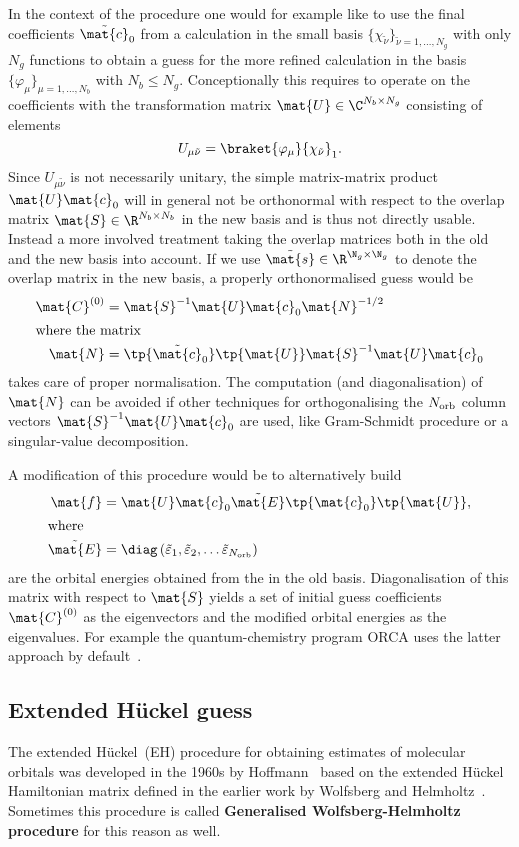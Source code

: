 In the context of the \SCF procedure one would for example
like to use the final coefficients $\tilde{\mat{c}}_0$ from a calculation
in the small basis $\{\chi_{\tilde{\nu}}\}_{\tilde{\nu}=1,\ldots,N_g}$
with only $N_g$ functions
to obtain a guess for the more refined calculation in the basis
$\{\varphi_\mu\}_{\mu=1,\ldots,N_b}$ with $N_b \leq N_g$.
Conceptionally this requires to operate on the coefficients
with the transformation matrix
$\mat{U} \in \C^{N_b\times N_g}$
consisting of elements
\[ U_{\mu\tilde{\nu}} = \braket{\varphi_\mu}{\chi_{\tilde{\nu}}}_1. \]
Since $U_{\mu\tilde{\nu}}$ is not necessarily unitary,
the simple matrix-matrix product $\mat{U} \mat{c}_0$
will in general not be orthonormal
with respect to the overlap matrix $\mat{S} \in \R^{N_b \times N_b}$
in the new basis and is thus not directly usable.
Instead a more involved treatment taking the overlap matrices
both in the old and the new basis into account.
If we use $\tilde{\mat{s}} \in \R^{\N_g \times \N_g}$
to denote the overlap matrix in the new basis,
a properly orthonormalised guess would be~\cite{Polly2004}
\begin{align}
	\mat{C}^{(0)} &= \mat{S}^{-1} \mat{U} \mat{c}_0 \mat{N}^{-1/2} \\
	\intertext{where the matrix}
	\mat{N} &= \tp{\tilde{\mat{c}}_0} \tp{\mat{U}} \mat{S}^{-1} \mat{U} \mat{c}_0
\end{align}
takes care of proper normalisation.
The computation (and diagonalisation) of $\mat{N}$
can be avoided if other techniques
for orthogonalising the $N_\text{orb}$ column vectors $\mat{S}^{-1} \mat{U} \mat{c}_0$
are used, like Gram-Schmidt procedure or a singular-value decomposition.

A modification of this procedure would be to alternatively build
\begin{align}
	\label{eqn:GuessMatF}
	\mat{f} &= \mat{U} \mat{c}_0 \tilde{\mat{E}} \tp{\mat{c}_0} \tp{\mat{U}}, \\
	\intertext{where}
	\nonumber
	\tilde{\mat{E}} &= \diag\left(\tilde{\varepsilon}_1, \tilde{\varepsilon}_2,
			\ldots \tilde{\varepsilon}_{\Norb}\right)
\end{align}
are the orbital energies obtained from the \SCF in the old basis.
Diagonalisation of this matrix with respect to $\mat{S}$
yields a set of initial guess coefficients $\mat{C}^{(0)}$ as the eigenvectors
and the modified orbital energies as the eigenvalues.
For example the quantum-chemistry program ORCA uses the latter
approach by default~\cite{ORCA}.

\subsection{Extended Hückel guess}
The extended Hückel~(EH) procedure for obtaining estimates
of molecular orbitals was developed in the 1960s
by Hoffmann~\cite{Hoffmann1963}
based on the extended Hückel Hamiltonian matrix defined
in the earlier work by Wolfsberg and Helmholtz~\cite{Wolfsberg1952}.
Sometimes this procedure is called
\textbf{Generalised Wolfsberg-Helmholtz procedure}
for this reason as well.

